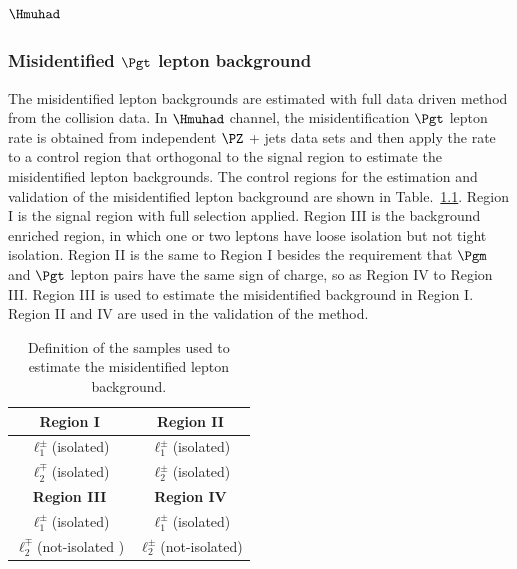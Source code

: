 

\chapter{$\Hmuhad$}

\subsection{Misidentified $\Pgt$ lepton background}
The misidentified lepton backgrounds are estimated with full data driven method from the collision data. In $\Hmuhad$ channel, the misidentification $\Pgt$ lepton rate is obtained from independent $\PZ$ + jets data sets and then apply the rate to a control region that orthogonal to the signal region to estimate the misidentified lepton backgrounds.  The control regions for the estimation and validation of the misidentified lepton background are shown in Table.~\ref{tab:fakeratediagram_highmass}. Region I is the signal region with full selection applied. Region III is the background enriched region, in which one or two leptons have loose isolation but not tight isolation. Region II is the same to Region I besides the requirement that $\Pgm$ and $\Pgt$ lepton pairs have the same sign of charge, so as Region IV to Region III. Region III is used to estimate the misidentified background in Region I. Region II and IV are used in the validation of the method. 


\begin{table}[hbt]
 \centering
 {
 \renewcommand{\arraystretch}{1.1}
 \caption{Definition of the samples used to estimate the misidentified lepton background.}
  \label{tab:fakeratediagram_highmass}
  \begin{tabular}{c|c} \hline
\textbf{Region I}              &  \textbf{Region II}             \\ \hline
$\ell^{\pm}_{1}$(isolated)  &  $\ell^{\pm}_{1}$(isolated)             \\
$\ell^{\mp}_{2}$(isolated)  &  $\ell^{\pm}_{2}$(isolated)             \\

\hline \hline
\textbf{Region III}           &  \textbf{Region IV}             \\ \hline
$\ell^{\pm}_{1}$(isolated)  &  $\ell^{\pm}_{1}$(isolated)             \\
$\ell^{\mp}_{2}$(not-isolated )  &  $\ell^{\pm}_{2}$(not-isolated)             \\
\hline
  \end{tabular}
}
\end{table}


